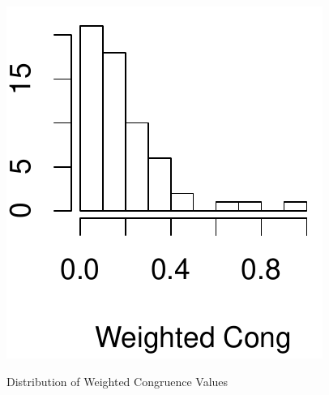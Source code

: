 \begin{figure}[t]
{	\includegraphics[scale=0.372]{figures/hist_weighted_err}
     \label{subfig:hist_weighted_err}
  }
	\caption{Distribution of Weighted Congruence Values}
	\label{fig:hist_weighted_congruence}
\end{figure}





